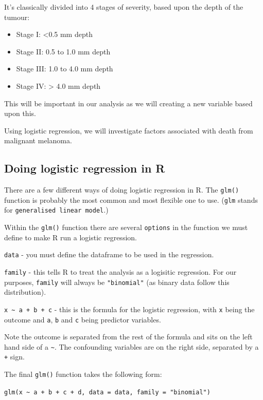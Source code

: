 \documentclass[12pt,]{krantz}
\providecommand{\tightlist}{%
  \setlength{\itemsep}{0pt}\setlength{\parskip}{0pt}}
\theoremstyle{definition}
\theoremstyle{definition}
\theoremstyle{definition}
\theoremstyle{remark}
\begin{document}
It's classically divided into 4 stages of severity, based upon the depth
of the tumour:

\begin{itemize}
\tightlist
\item
  Stage I: \textless{}0.5 mm depth
\item
  Stage II: 0.5 to 1.0 mm depth
\item
  Stage III: 1.0 to 4.0 mm depth
\item
  Stage IV: \textgreater{} 4.0 mm depth
\end{itemize}

This will be important in our analysis as we will creating a new
variable based upon this.

Using logistic regression, we will investigate factors associated with
death from malignant melanoma.

\hypertarget{doing-logistic-regression-in-r}{%
\subsection{Doing logistic regression in
R}\label{doing-logistic-regression-in-r}}

There are a few different ways of doing logistic regression in R. The
\texttt{glm()} function is probably the most common and most flexible
one to use. (\texttt{glm} stands for
\texttt{generalised\ linear\ model}.)

Within the \texttt{glm()} function there are several \texttt{options} in
the function we must define to make R run a logistic regression.

\texttt{data} - you must define the dataframe to be used in the
regression.

\texttt{family} - this tells R to treat the analysis as a logisitic
regression. For our purposes, \texttt{family} will always be
\texttt{"binomial"} (as binary data follow this distribution).

\texttt{x\ \textasciitilde{}\ a\ +\ b\ +\ c} - this is the formula for
the logistic regression, with \texttt{x} being the outcome and
\texttt{a}, \texttt{b} and \texttt{c} being predictor variables.

Note the outcome is separated from the rest of the formula and sits on
the left hand side of a \texttt{\textasciitilde{}}. The confounding
variables are on the right side, separated by a \texttt{+} sign.

The final \texttt{glm()} function takes the following form:

\texttt{glm(x\ \textasciitilde{}\ a\ +\ b\ +\ c\ +\ d,\ data\ =\ data,\ family\ =\ "binomial")}
\end{document}
